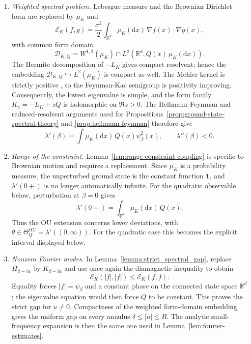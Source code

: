 \documentclass[11pt,reqno]{amsart}
\theoremstyle{definition}
\numberwithin{equation}{section}
\newcommand{\<}{\langle}
\renewcommand{\>}{\rangle}
\def\de{{\rm d}}
\def\de{{\mathrm {d}}}
\begin{document}
\begin{enumerate}
\item[(i)] \emph{Weighted spectral problem.}
Lebesgue measure and the Brownian Dirichlet form are replaced by
$\mu_K$ and
\[
    \mathcal E_K(f,g)
      =\frac{\sigma^2}{2}
        \int_{\mathbb R^d}\mu_K (\de x) \, \nabla f (x) \cdot\nabla\overline g (x),
\]
with common form domain
\[
    \mathcal D_{K,Q}
      =W^{1,2}(\mu_K)\cap
        L^2(\mathbb R^d,Q(x)\, \mu_K(\de x)).
\]
The Hermite decomposition of $-L_K$ gives compact resolvent; hence the
embedding $\mathcal D_{K,Q}\hookrightarrow L^2(\mu_K)$ is compact as well.
The Mehler kernel is strictly positive \cite{Stroock20,Bogachev}, so the Feynman-Kac semigroup is
positivity improving.  Consequently, the lowest eigenvalue is simple, and
the form family $K_z=-L_K+zQ$ is holomorphic on $\Re z>0$.  The
Hellmann-Feynman and reduced-resolvent arguments used for
Propositions~\ref{prop:ground-state-spectral-theory} and
\ref{prop:hellmann-feynman} therefore give
\[
    \lambda'(\beta)=\int \mu_K(\de x)\,  Q(x)\psi_\beta^2(x),
    \qquad
    \lambda''(\beta)<0.
\]

\item[(ii)] \emph{Range of the constraint.}
Lemma~\ref{lem:range-constraint-coupling} is specific to Brownian motion and
requires a replacement.  Since $\mu_K$ is a probability measure, the unperturbed ground state is the constant function $\mathbf 1$, and $\lambda'(0+)$ is no longer automatically infinite.  For the quadratic observable below, perturbation at $\beta=0$ gives
\[
    \lambda'(0+)=\int_{\mathbb R^d}\mu_K(\de x) \, Q(x).
\]
Thus the OU extension concerns lower deviations, with
$\theta\in\Theta_Q^{\mathrm{OU}}=\lambda'((0,\infty))$.  For the quadratic
case this becomes the explicit interval displayed below.

\item[(iii)] \emph{Nonzero Fourier modes.}
In Lemma~\ref{lemma:strict_spectral_gap}, replace $H_{\beta-iu}$ by
$K_{\beta-iu}$ and use once again the diamagnetic inequality to obtain
\[
    \mathcal E_K(|f|,|f|)\leq\mathcal E_K(f,f).
\]
Equality forces $|f|=\psi_\beta$ and a constant phase on the connected state
space $\mathbb R^d$; the eigenvalue equation would then force $Q$ to be
constant.  This proves the strict gap for $u\neq0$.  Compactness of the
weighted form-domain embedding gives the uniform gap on every annulus
$\delta\leq|u|\leq R$.  The analytic small-frequency expansion is then the
same one used in Lemma~\ref{lem:fourier-estimates}.


\end{enumerate}
\end{document}

